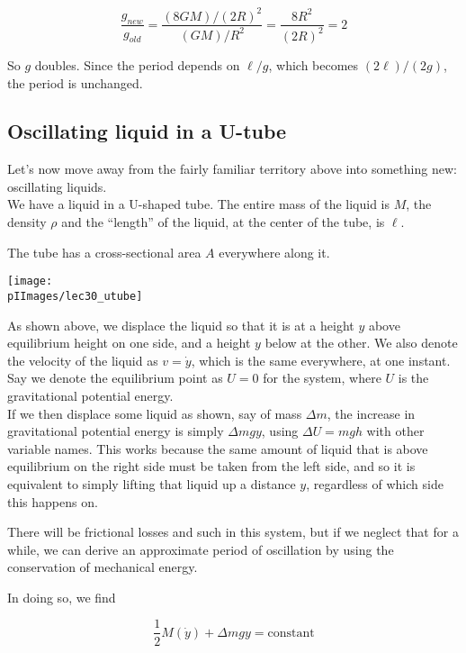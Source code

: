 \begin{equation}
\frac{g_{new}}{g_{old}} = \frac{(8 GM)/(2R)^2}{(G M)/R^2} = \frac{8R^2}{(2R)^2} = 2
\end{equation}

So $g$ doubles. Since the period depends on $\ell/g$, which becomes $(2\ell)/(2g)$, the period is unchanged.

\subsection{Oscillating liquid in a U-tube}

Let's now move away from the fairly familiar territory above into something new: oscillating liquids.\\
We have a liquid in a U-shaped tube. The entire mass of the liquid is $M$, the density $\rho$ and the ``length'' of the liquid, at the center of the tube, is $\ell$.

The tube has a cross-sectional area $A$ everywhere along it.

\begin{center}
\texttt{[image: \\pIImages/lec30\_utube]}
\end{center}

As shown above, we displace the liquid so that it is at a height $y$ above equilibrium height on one side, and a height $y$ below at the other. We also denote the velocity of the liquid as $v = \dot{y}$, which is the same everywhere, at one instant.\\
Say we denote the equilibrium point as $U = 0$ for the system, where $U$ is the gravitational potential energy.\\
If we then displace some liquid as shown, say of mass $\Delta m$, the increase in gravitational potential energy is simply $\Delta m g y$, using $\Delta U = m g h$ with other variable names. This works because the same amount of liquid that is above equilibrium on the right side must be taken from the left side, and so it is equivalent to simply lifting that liquid up a distance $y$, regardless of which side this happens on.

There will be frictional losses and such in this system, but if we neglect that for a while, we can derive an approximate period of oscillation by using the conservation of mechanical energy.

In doing so, we find

\begin{equation}
\frac{1}{2} M (\dot{y}) + \Delta m g y = \text{constant}
\end{equation}

